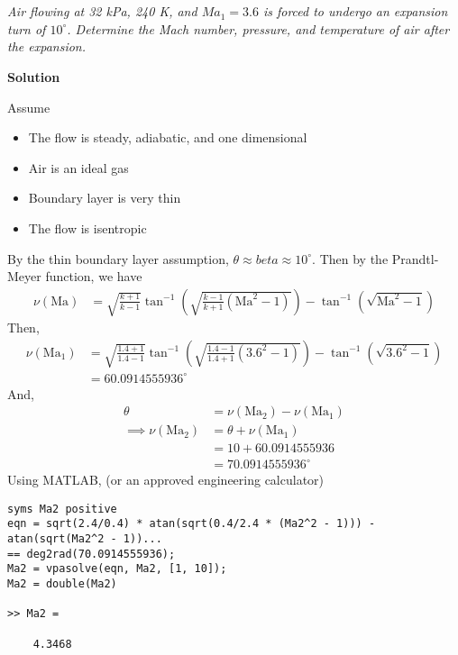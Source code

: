 \section{}
\textit{Air flowing at 32 kPa, 240 K, and $Ma_1 = 3.6$ is forced to undergo an expansion turn of $10^\circ$. Determine the Mach number, pressure, and temperature of air after the expansion.}

\textbf{Solution}

Assume 
\begin{itemize}
    \item The flow is steady, adiabatic, and one dimensional
    \item Air is an ideal gas
    \item Boundary layer is very thin
    \item The flow is isentropic
\end{itemize}
By the thin boundary layer assumption, $\theta \approx beta \approx 10^\circ$. Then by the Prandtl-Meyer function, we have
\begin{align*}
    \nu (\text{Ma}) &= \sqrt{\frac{k + 1}{k - 1}} \tan^{-1} \left( \sqrt{\frac{k - 1}{k + 1} (\text{Ma}^2 - 1)} \right) - \tan^{-1} \left( \sqrt{\text{Ma}^2 - 1} \right)
\end{align*}
Then,
\begin{align*}
    \nu (\text{Ma}_1) &= \sqrt{\frac{1.4+1}{1.4-1}} \tan^{-1} \left( \sqrt{\frac{1.4-1}{1.4+1} (3.6^2 - 1)} \right) - \tan^{-1} \left( \sqrt{3.6^2 - 1} \right) \\
    &= 60.0914555936^\circ
\end{align*}
And,
\begin{align*}
    \theta &= \nu (\text{Ma}_2) - \nu (\text{Ma}_1) \\
    \implies \nu (\text{Ma}_2) &= \theta + \nu (\text{Ma}_1) \\
    &= 10 + 60.0914555936 \\
    &= 70.0914555936^\circ
\end{align*}
Using MATLAB, (or an approved engineering calculator)
\begin{verbatim}
syms Ma2 positive
eqn = sqrt(2.4/0.4) * atan(sqrt(0.4/2.4 * (Ma2^2 - 1))) - atan(sqrt(Ma2^2 - 1))...
== deg2rad(70.0914555936);
Ma2 = vpasolve(eqn, Ma2, [1, 10]);
Ma2 = double(Ma2)

>> Ma2 =

    4.3468

\end{verbatim}
